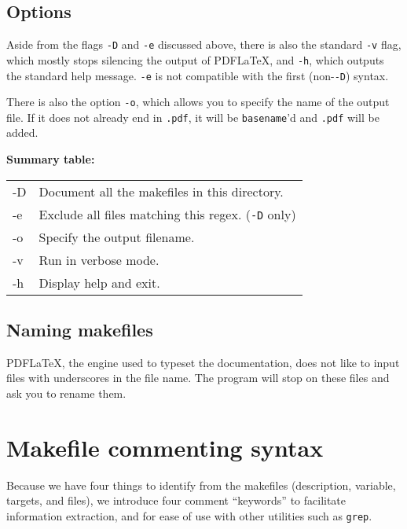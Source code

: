 \documentclass[oneside,11pt]{article}
\begin{document}
	\subsection{Options}
	
	Aside from the flags \texttt{-D} and \texttt{-e} discussed above, there is also the standard \texttt{-v} flag, which mostly stops silencing the output of PDF\LaTeX, and \texttt{-h}, which outputs the standard help message. \texttt{-e} is not compatible with the first (non-\texttt{-D}) syntax.
	
	There is also the option \texttt{-o}, which allows you to specify the name of the output file. If it does not already end in \texttt{.pdf}, it will be \texttt{basename}'d and \texttt{.pdf} will be added.
	
	\begin{center}
	\end{center}
	
	\begin{minipage}{\textwidth}
		\textbf{Summary table:}	\\
		\begin{tabularx}{\textwidth}{>{\ttfamily}l X}
			-D & Document all the makefiles in this directory. \\
			-e & Exclude all files matching this regex. (\texttt{-D} only) \\
			-o & Specify the output filename. \\
			-v & Run in verbose mode. \\
			-h & Display help and exit.  \\
		\end{tabularx}
	\end{minipage}
		
	\subsection{Naming makefiles}
	
	PDF\LaTeX, the engine used to typeset the documentation, does not like to input files with underscores in the file name. The program will stop on these files and ask you to rename them. 

	
	\section{Makefile commenting syntax}
	
	Because we have four things to identify from the makefiles (description, variable, targets, and files), we introduce four comment ``keywords'' to facilitate information extraction, and for ease of use with other utilities such as \texttt{grep}.
	
\end{document}
